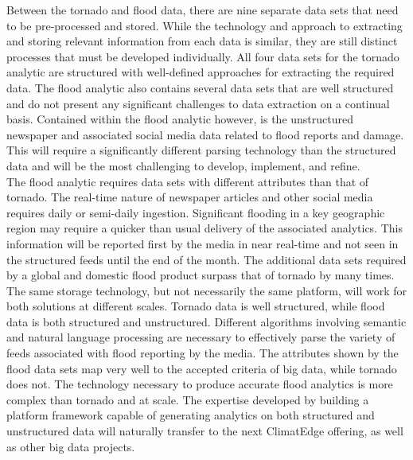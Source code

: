 Between the tornado and flood data, there are nine separate data sets that need to be pre-processed and stored. While the technology and approach to extracting and storing relevant information from each data is similar, they are still distinct processes that must be developed individually. All four data sets for the tornado analytic are structured with well-defined approaches for extracting the required data. The flood analytic also contains several data sets that are well structured and do not present any significant challenges to data extraction on a continual basis. Contained within the flood analytic however, is the unstructured newspaper and associated social media data related to flood reports and damage. This will require a significantly different parsing technology than the structured data and will be the most challenging to develop, implement, and refine.\\

The flood analytic requires data sets with different attributes than that of tornado. The real-time nature of newspaper articles and other social media requires daily or semi-daily ingestion. Significant flooding in a key geographic region may require a quicker than usual delivery of the associated analytics. This information will be reported first by the media in near real-time and not seen in the structured feeds until the end of the month. The additional data sets required by a global and domestic flood product surpass that of tornado by many times. The same storage technology, but not necessarily the same platform, will work for both solutions at different scales. Tornado data is well structured, while flood data is both structured and unstructured. Different algorithms involving semantic and natural language processing are necessary to effectively parse the variety of feeds associated with flood reporting by the media.  The attributes shown by the flood data sets map very well to the accepted criteria of big data, while tornado does not. The technology necessary to produce accurate flood analytics is more complex than tornado and at scale. The expertise developed by building a platform framework capable of generating analytics on both structured and unstructured data will naturally transfer to the next ClimatEdge offering, as well as other big data projects.
